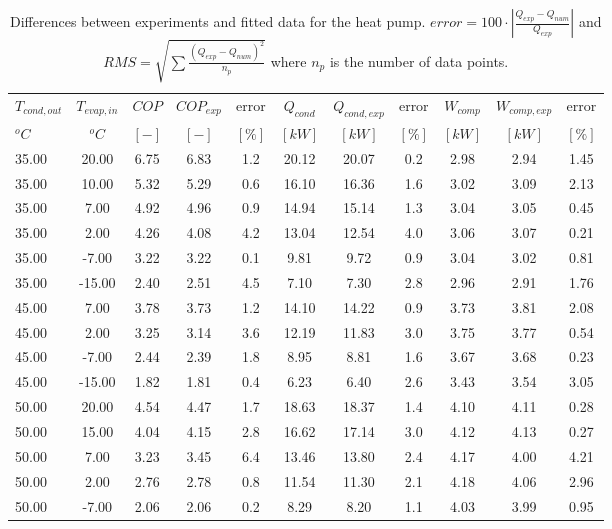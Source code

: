\documentclass[english]{SPFShortReport}
\begin{document}
\begin{table}[!ht]
\begin{small}
\caption{Differences between experiments and fitted data for the heat pump.          $error=100 \cdot |\frac{Q_{exp}-Q_{num}}{Q_{exp}}|$ and $RMS = \sqrt { \sum{\frac{(Q_{exp}-Q_{num})^2}{n_p}} }$ where $n_p$ is the number of data points.}
\begin{center}
\resizebox{12cm}{!} 
{
\begin{tabular}{l | c c c c c c c c c c } 
\hline
\hline
$T_{cond,out}$ &$T_{evap,in}$ &$COP$ &$COP_{exp}$ &error &$Q_{cond}$ &$Q_{cond,exp}$ &error &$W_{comp}$ &$W_{comp,exp}$ &error \\ 
$^oC$ &$^oC$ &$[-]$ &$[-]$ &$[\%]$ &$[kW]$ &$[kW]$ &$[\%]$ &$[kW]$ &$[kW]$ &$[\%]$\\ 
\hline
35.00  & 20.00 & 6.75 & 6.83 & 1.2 & 20.12 & 20.07 & 0.2 & 2.98 & 2.94 & 1.45\\ 
35.00  & 10.00 & 5.32 & 5.29 & 0.6 & 16.10 & 16.36 & 1.6 & 3.02 & 3.09 & 2.13\\ 
35.00  & 7.00 & 4.92 & 4.96 & 0.9 & 14.94 & 15.14 & 1.3 & 3.04 & 3.05 & 0.45\\ 
35.00  & 2.00 & 4.26 & 4.08 & 4.2 & 13.04 & 12.54 & 4.0 & 3.06 & 3.07 & 0.21\\ 
35.00  & -7.00 & 3.22 & 3.22 & 0.1 & 9.81 & 9.72 & 0.9 & 3.04 & 3.02 & 0.81\\ 
35.00  & -15.00 & 2.40 & 2.51 & 4.5 & 7.10 & 7.30 & 2.8 & 2.96 & 2.91 & 1.76\\ 
45.00  & 7.00 & 3.78 & 3.73 & 1.2 & 14.10 & 14.22 & 0.9 & 3.73 & 3.81 & 2.08\\ 
45.00  & 2.00 & 3.25 & 3.14 & 3.6 & 12.19 & 11.83 & 3.0 & 3.75 & 3.77 & 0.54\\ 
45.00  & -7.00 & 2.44 & 2.39 & 1.8 & 8.95 & 8.81 & 1.6 & 3.67 & 3.68 & 0.23\\ 
45.00  & -15.00 & 1.82 & 1.81 & 0.4 & 6.23 & 6.40 & 2.6 & 3.43 & 3.54 & 3.05\\ 
50.00  & 20.00 & 4.54 & 4.47 & 1.7 & 18.63 & 18.37 & 1.4 & 4.10 & 4.11 & 0.28\\ 
50.00  & 15.00 & 4.04 & 4.15 & 2.8 & 16.62 & 17.14 & 3.0 & 4.12 & 4.13 & 0.27\\ 
50.00  & 7.00 & 3.23 & 3.45 & 6.4 & 13.46 & 13.80 & 2.4 & 4.17 & 4.00 & 4.21\\ 
50.00  & 2.00 & 2.76 & 2.78 & 0.8 & 11.54 & 11.30 & 2.1 & 4.18 & 4.06 & 2.96\\ 
50.00  & -7.00 & 2.06 & 2.06 & 0.2 & 8.29 & 8.20 & 1.1 & 4.03 & 3.99 & 0.95\\ 

\end{tabular}}
\end{center}
\end{small}
\end{table}
\end{document}
